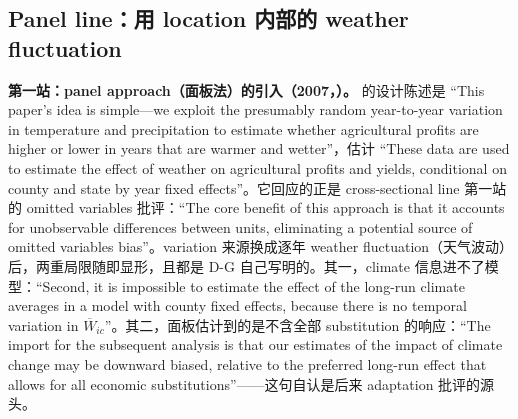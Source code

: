 \subsection{Panel line：用 location 内部的 weather fluctuation}

\textbf{第一站：panel approach（面板法）的引入（2007，）。}\citet{deschenes2007economic} 的设计陈述是 ``This paper's idea is simple—we exploit the presumably random year-to-year variation in temperature and precipitation to estimate whether agricultural profits are higher or lower in years that are warmer and wetter''\citep[第~355 页]{deschenes2007economic}，估计 ``These data are used to estimate the effect of weather on agricultural profits and yields, conditional on county and state by year fixed effects''\citep[第~355 页；此思路本身可追溯到 Huntington 1922，考据见 \citealp{hsiang2016climate} 第~6--7 页]{deschenes2007economic}。它回应的正是 cross-sectional line 第一站的 omitted variables 批评：``The core benefit of this approach is that it accounts for unobservable differences between units, eliminating a potential source of omitted variables bias''\citep[第~7 页]{hsiang2016climate}。variation 来源换成逐年 weather fluctuation（天气波动）后，两重局限随即显形，且都是 D-G 自己写明的。其一，climate 信息进不了模型：``Second, it is impossible to estimate the effect of the long-run climate averages in a model with county fixed effects, because there is no temporal variation in $\overline{W}_{ic}$''\citep[第~367 页；$\overline{W}_{ic}$ 为 climate normals，即各县的长期 climate 变量——\citet{merel2021climate} 第~1207 页所引即此句]{deschenes2007economic}。其二，面板估计到的是不含全部 substitution 的响应：``The import for the subsequent analysis is that our estimates of the impact of climate change may be downward biased, relative to the preferred long-run effect that allows for all economic substitutions''\citep[第~359 页]{deschenes2007economic}——这句自认是后来 adaptation 批评的源头。

